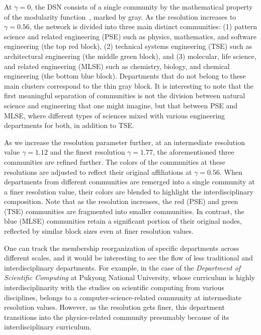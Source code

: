 \documentclass{bmcart}
\begin{document}
At \( \gamma = 0 \), the DSN consists of a single community by the mathematical property of the modularity function~\cite{Porter2009,Fortunato2010}, marked by gray. As the resolution increases to \( \gamma = 0.56 \), the network is divided into three main distinct communities: (1) pattern science and related engineering (PSE) such as physics, mathematics, and software engineering (the top red block), (2) technical systems engineering (TSE) such as architectural engineering (the middle green block), and (3) molecular, life science, and related engineering (MLSE) such as chemistry, biology, and chemical engineering (the bottom blue block). Departments that do not belong to these main clusters correspond to the thin gray block. It is interesting to note that the first meaningful separation of communities is not the division between natural science and engineering that one might imagine, but that between PSE and MLSE, where different types of sciences mixed with various engineering departments for both, in addition to TSE. 

As we increase the resolution parameter further, at an intermediate resolution value \( \gamma = 1.12 \) and the finest resolution \( \gamma = 1.77 \), the aforementioned three communities are refined further. The colors of the communities at these resolutions are adjusted to reflect their original affiliations at \( \gamma = 0.56 \). When departments from different communities are remerged into a single community at a finer resolution value, their colors are blended to highlight the interdisciplinary composition. Note that as the resolution increases, the red (PSE) and green (TSE) communities are fragmented into smaller communities. In contrast, the blue (MLSE) communities retain a significant portion of their original nodes, reflected by similar block sizes even at finer resolution values.

One can track the membership reorganization of specific departments across different scales, and it would be interesting to see the flow of less traditional and interdisciplinary departments. 
For example, in the case of the \textit{Department of Scientific Computing} at Pukyong National University, whose curriculum is highly interdisciplinarity with the studies on scientific computing from various disciplines, belongs to a computer-science-related community at intermediate resolution values. However, as the resolution gets finer, this department transitions into the physics-related community presumably because of its interdisciplinary curriculum.
\end{document}
